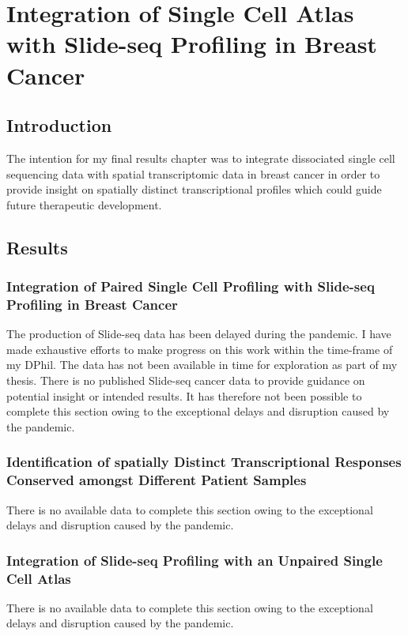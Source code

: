 \chapter{\label{ch:5}Integration of Single Cell Atlas with Slide-seq Profiling in Breast Cancer}

\section{Introduction}
The intention for my final results chapter was to integrate dissociated single cell sequencing data with spatial transcriptomic data in breast cancer in order to provide insight on spatially distinct transcriptional profiles which could guide future therapeutic development.


\section{Results}

\subsection{Integration of Paired Single Cell Profiling with Slide-seq Profiling in Breast Cancer}
The production of Slide-seq data has been delayed during the pandemic. I have made exhaustive efforts to make progress on this work within the time-frame of my DPhil. The data has not been available in time for exploration as part of my thesis. There is no published Slide-seq cancer data to provide guidance on potential insight or intended results. It has therefore not been possible to complete this section owing to the exceptional delays and disruption caused by the pandemic. 

\subsection{Identification of spatially Distinct Transcriptional Responses Conserved amongst Different Patient Samples}
There is no available data to complete this section owing to the exceptional delays and disruption caused by the pandemic. 

\subsection{Integration of Slide-seq Profiling with an Unpaired Single Cell Atlas}
There is no available data to complete this section owing to the exceptional delays and disruption caused by the pandemic. 

